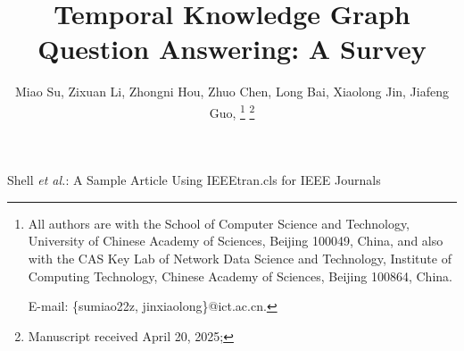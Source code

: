 \documentclass[lettersize,journal,compsoc]{IEEEtran}
\begin{document}
\title{Temporal Knowledge Graph Question Answering: A Survey}

\author{Miao Su, Zixuan Li, Zhongni Hou, Zhuo Chen, Long Bai, Xiaolong Jin, Jiafeng Guo, 
        \thanks{All authors are with the School of Computer Science and Technology, University of Chinese Academy of Sciences, Beijing 100049, China, and also with the CAS Key Lab of Network Data Science and Technology, Institute of Computing Technology, Chinese Academy of Sciences, Beijing 100864, China. 
        
        E-mail: \{sumiao22z, jinxiaolong\}@ict.ac.cn.}
\thanks{Manuscript received April 20, 2025;}}

%
{Shell \MakeLowercase{\textit{et al.}}: A Sample Article Using IEEEtran.cls for IEEE Journals}



\maketitle









\balance




\appendices

\end{document}
